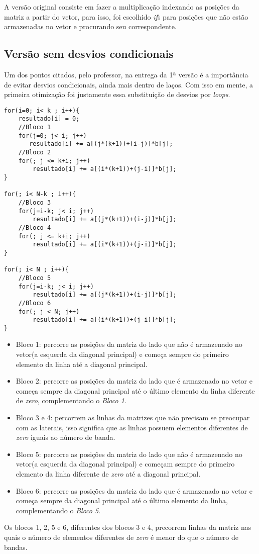 \documentclass[12pt]{article}
\begin{document}
A versão original consiste em fazer a multiplicação indexando as posições da matriz a partir do vetor, para isso, foi escolhido \textit{if}s para posições que não estão armazenadas no vetor e procurando seu correspondente.

\subsection{Versão sem desvios condicionais}
Um dos pontos citados, pelo professor, na entrega da 1ª versão é a importância de evitar desvios condicionais, ainda mais dentro de laços. Com isso em mente, a primeira otimização foi justamente essa substituição de desvios por \textit{loops}.
\begin{lstlisting}
for(i=0; i< k ; i++){
    resultado[i] = 0;
    //Bloco 1
    for(j=0; j< i; j++)
       resultado[i] += a[(j*(k+1))+(i-j)]*b[j];
    //Bloco 2
    for(; j <= k+i; j++)
        resultado[i] += a[(i*(k+1))+(j-i)]*b[j];
}

for(; i< N-k ; i++){
    //Bloco 3
    for(j=i-k; j< i; j++)
        resultado[i] += a[(j*(k+1))+(i-j)]*b[j];
    //Bloco 4
    for(; j <= k+i; j++)
        resultado[i] += a[(i*(k+1))+(j-i)]*b[j];
}

for(; i< N ; i++){
    //Bloco 5
    for(j=i-k; j< i; j++)
        resultado[i] += a[(j*(k+1))+(i-j)]*b[j];
    //Bloco 6
    for(; j < N; j++)
        resultado[i] += a[(i*(k+1))+(j-i)]*b[j];
}
\end{lstlisting}

\begin{itemize}
\item Bloco 1: percorre as posições da matriz do lado que não é armazenado no vetor(a esquerda da diagonal principal) e começa sempre do primeiro elemento da linha até a diagonal principal.
\item Bloco 2: percorre as posições da matriz do lado que é armazenado no vetor e começa sempre da diagonal principal até o último elemento da linha diferente de \textit{zero}, complementando o \textit{Bloco 1}.
\item Bloco 3 e 4: percorrem as linhas da matrizes que não precisam se preocupar com as laterais, isso significa que as linhas possuem elementos diferentes de \textit{zero} iguais ao número de banda.
\item Bloco 5: percorre as posições da matriz do lado que não é armazenado no vetor(a esquerda da diagonal principal) e começam sempre do primeiro elemento da linha diferente de \textit{zero} até a diagonal principal.
\item Bloco 6: percorre as posições da matriz do lado que é armazenado no vetor e começa sempre da diagonal principal até o último elemento da linha, complementando o \textit{Bloco 5}.
\end{itemize}
Os blocos 1, 2, 5 e 6, diferentes dos blocos 3 e 4, precorrem linhas da matriz nas quais o número de elementos diferentes de \textit{zero} é menor do que o número de bandas.
\end{document}
